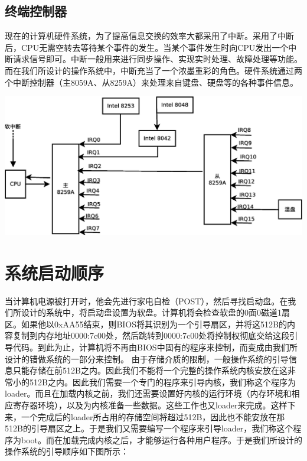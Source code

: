 \documentclass[UTF8,nofonts]{ctexrep}
\begin{document}
\subsection{终端控制器}
现在的计算机硬件系统，为了提高信息交换的效率大都采用了中断。采用了中断后，CPU无需空转去等待某个事件的发生。当某个事件发生时向CPU发出一个中断请求信号即可。中断一般用来进行同步操作、实现实时处理、故障处理等功能。而在我们所设计的操作系统中，中断充当了一个浓墨重彩的角色。硬件系统通过两个中断控制器（主8059A、从8259A）来处理来自键盘、硬盘等的各种事件信息。
\begin{center}
\includegraphics[scale=0.4]{interrupt.eps}
\end{center}
\section{系统启动顺序}
当计算机电源被打开时，他会先进行家电自检（POST），然后寻找启动盘。在我们所设计的系统中，将启动盘设置为软盘。计算机将会检查软盘的0面0磁道1扇区。如果他以0xAA55结束，则BIOS将其识别为一个引导扇区，并将这512B的内容复制到内存地址0000:7c00处，然后跳转到0000:7c00处将控制权彻底交给这段引导代码。到此为止，计算机将不再由BIOS中固有的程序来控制，而变成由我们所设计的错做系统的一部分来控制。
由于存储介质的限制，一般操作系统的引导信息只能存储在前512B之内。因此我们不能将一个完整的操作系统内核安放在这非常小的512B之内。因此我们需要一个专门的程序来引导内核，我们称这个程序为loader。而且在加载内核之前，我们还需要设置好内核的运行环境（内存环境和相应寄存器环境），以及为内核准备一些数据。这些工作也又loader来完成。这样下来，一个完成后的loader所占用的存储空间将超过512B，因此也不能安放在那512B的引导扇区之上。于是我们又需要编写一个程序来引导loader，我们称这个程序为boot。而在加载完成内核之后，才能够运行各种用户程序。于是我们所设计的操作系统的引导顺序如下图所示：
\end{document}
